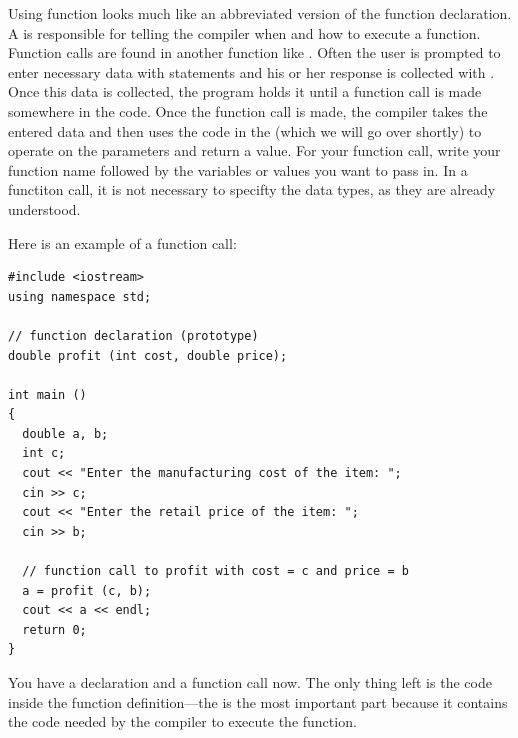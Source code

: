 Using function looks much like an abbreviated version of the function declaration. 
A  is responsible for telling the compiler when and how to execute a function.
Function calls are found in another function like . 
Often the user is prompted to enter necessary data with  statements and his or her response is collected with . 
Once this data is collected, the program holds it until a function call is made somewhere in the code.
Once the function call is made, the compiler takes the entered data and then uses the code in the  (which we will go over shortly) to operate on the parameters and return a value. 
For your function call, write your function name followed by the variables or values you want to pass in.
In a functiton call, it is not necessary to specifty the data types, as they are already understood.
 
Here is an example of a function call: \nopagebreak[4]

\noindent\begin{minipage}{\linewidth}\begin{lstlisting}
#include <iostream>
using namespace std;
 
// function declaration (prototype)
double profit (int cost, double price); 

int main ()
{
  double a, b;
  int c;
  cout << "Enter the manufacturing cost of the item: ";
  cin >> c;
  cout << "Enter the retail price of the item: ";
  cin >> b;
 
  // function call to profit with cost = c and price = b
  a = profit (c, b); 
  cout << a << endl;
  return 0;
}
\end{lstlisting}\end{minipage}
  
You have a declaration and a function call now. 
The only thing left is the code inside the function definition---the  is the most important part because it contains the code needed by the compiler to execute the function.

